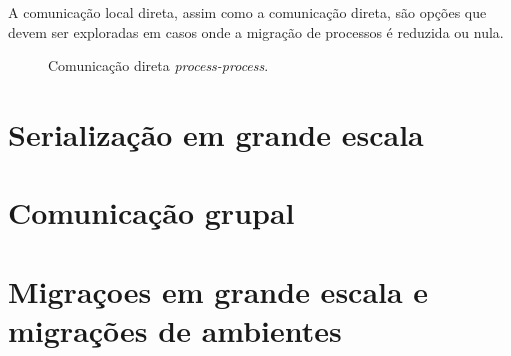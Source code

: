 A comunicação local direta, assim como a comunicação direta, são opções que devem ser exploradas em casos onde a migração de processos é reduzida ou nula.

\begin{figure}
  \caption{Comunicação direta \textit{process-process}.}
\label{fig:direta_mesmo}
\end{figure}

\section{Serialização em grande escala} %
\section{Comunicação grupal} %
\section{Migraçoes em grande escala e migrações de ambientes \label{migra_ambiente}} %
